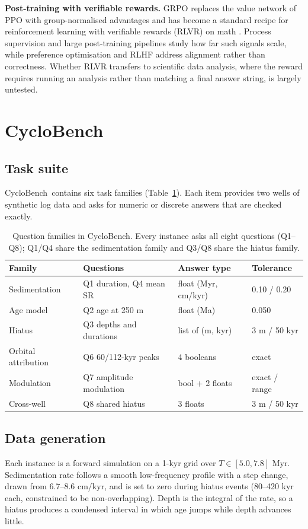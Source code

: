 \documentclass[10pt]{article}
\newcommand{\method}{CycloBench}
\begin{document}
\textbf{Post-training with verifiable rewards.} GRPO \citep{shao2024deepseekmath} replaces the
value network of PPO with group-normalised advantages and has become a standard recipe for
reinforcement learning with verifiable rewards (RLVR) on math \citep{yang2024qwenmath}. Process
supervision \citep{lightman2023verify} and large post-training pipelines \citep{lambert2024tulu3}
study how far such signals scale, while preference optimisation \citep{rafailov2023dpo} and RLHF
\citep{ouyang2022instructgpt} address alignment rather than correctness. Whether RLVR transfers
to scientific data analysis, where the reward requires running an analysis rather than matching
a final answer string, is largely untested.

\section{\method}
\label{sec:bench}
\subsection{Task suite}
\method\ contains six task families (Table~\ref{tab:tasks}). Each item provides two wells of
synthetic log data and asks for numeric or discrete answers that are checked exactly.

\begin{table}[t]
\centering
\small
\begin{tabular}{@{}llll@{}}
\toprule
Family & Questions & Answer type & Tolerance \\
\midrule
Sedimentation & Q1 duration, Q4 mean SR & float (Myr, cm/kyr) & 0.10 / 0.20 \\
Age model & Q2 age at 250 m & float (Ma) & 0.050 \\
Hiatus & Q3 depths and durations & list of (m, kyr) & 3 m / 50 kyr \\
Orbital attribution & Q6 60/112-kyr peaks & 4 booleans & exact \\
Modulation & Q7 amplitude modulation & bool + 2 floats & exact / range \\
Cross-well & Q8 shared hiatus & 3 floats & 3 m / 50 kyr \\
\bottomrule
\end{tabular}
\caption{Question families in \method. Every instance asks all eight questions
(Q1--Q8); Q1/Q4 share the sedimentation family and Q3/Q8 share the hiatus family.}
\label{tab:tasks}
\end{table}

\subsection{Data generation}
Each instance is a forward simulation on a 1-kyr grid over $T \in [5.0, 7.8]$ Myr.
Sedimentation rate follows a smooth low-frequency profile with a step change, drawn
from 6.7--8.6 cm/kyr, and is set to zero during hiatus events (80--420 kyr each,
constrained to be non-overlapping). Depth is the integral of the rate, so a hiatus
produces a condensed interval in which age jumps while depth advances little.
\end{document}
